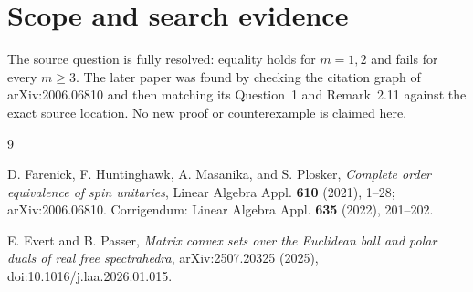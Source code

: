 \documentclass[10pt]{article}
\begin{document}
\section*{Scope and search evidence}

The source question is fully resolved: equality holds for $m=1,2$ and fails
for every $m\geq3$.  The later paper was found by checking the citation graph
of arXiv:2006.06810 and then matching its Question~1 and Remark~2.11 against
the exact source location.  No new proof or counterexample is claimed here.

\begin{thebibliography}{9}

D. Farenick, F. Huntinghawk, A. Masanika, and S. Plosker,
\emph{Complete order equivalence of spin unitaries},
Linear Algebra Appl. \textbf{610} (2021), 1--28;
arXiv:2006.06810.  Corrigendum: Linear Algebra Appl. \textbf{635}
(2022), 201--202.

E. Evert and B. Passer,
\emph{Matrix convex sets over the Euclidean ball and polar duals of real
free spectrahedra}, arXiv:2507.20325 (2025),
doi:10.1016/j.laa.2026.01.015.

\end{thebibliography}
\end{document}

